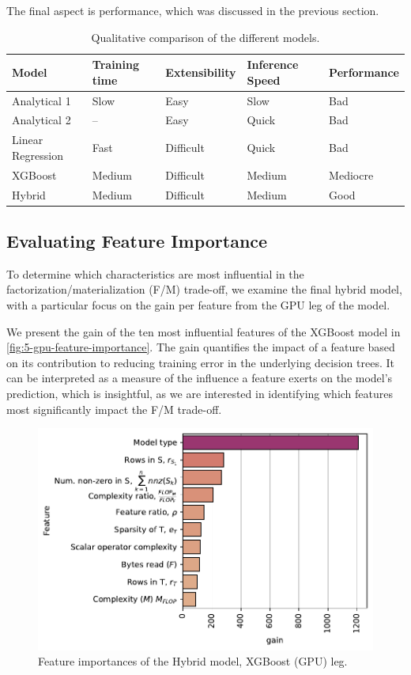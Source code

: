 The final aspect is performance, which was discussed in the previous section.

\begin{table}[ht]
  \centering
  \begin{tabular}{lllll}
    \toprule
    Model             & Training time & Extensibility & Inference Speed & Performance \\
    \midrule
    Analytical 1      & Slow          & Easy          & Slow            & Bad         \\
    Analytical 2      & --            & Easy          & Quick           & Bad         \\
    Linear Regression & Fast          & Difficult     & Quick           & Bad         \\
    XGBoost           & Medium        & Difficult     & Medium          & Mediocre    \\
    Hybrid            & Medium        & Difficult     & Medium          & Good        \\
    \bottomrule
  \end{tabular}
  \caption{Qualitative comparison of the different models.}
  \label{tab:5-meta-results}
\end{table}

\subsection{Evaluating Feature Importance}
\label{subsec:6-feature-importance}
To determine which characteristics are most influential in the factorization/materialization (F/M) trade-off, we examine the final hybrid model, with a particular focus on the gain per feature from the GPU leg of the model.

We present the gain of the ten most influential features of the XGBoost model in \autoref{fig:5-gpu-feature-importance}. The gain quantifies the impact of a feature based on its contribution to reducing training error in the underlying decision trees. It can be interpreted as a measure of the influence a feature exerts on the model's prediction, which is insightful, as we are interested in identifying which features most significantly impact the F/M trade-off.
\begin{figure}[ht]
  \centering
  \includegraphics[width=0.75\linewidth]{chapters/05_cost_estimation/figures/xgboost-feat-importance.pdf}
  \caption[Feature importances of the hybrid model]{Feature importances of the Hybrid model, XGBoost (GPU) leg.}
  \label{fig:5-gpu-feature-importance}
\end{figure}


